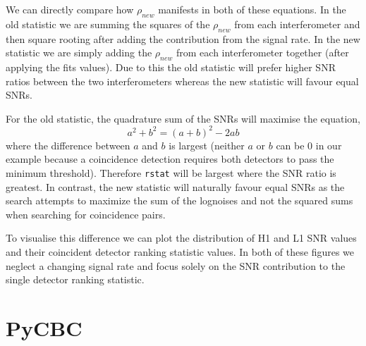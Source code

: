 We can directly compare how $\rho_{new}$ manifests in both of these equations. In the old statistic we are summing the squares of the $\rho_{new}$ from each interferometer and then square rooting after adding the contribution from the signal rate. In the new statistic we are simply adding the $\rho_{new}$ from each interferometer together (after applying the fits values). Due to this the old statistic will prefer higher SNR ratios between the two interferometers whereas the new statistic will favour equal SNRs.

For the old statistic, the quadrature sum of the SNRs will maximise the equation,
%
\begin{equation}
    a^{2} + b^{2} = (a + b)^{2} - 2ab
\end{equation}
%
where the difference between $a$ and $b$ is largest (neither $a$ or $b$ can be $0$ in our example because a coincidence detection requires both detectors to pass the minimum threshold). Therefore \verb|rstat| will be largest where the SNR ratio is greatest. In contrast, the new statistic will naturally favour equal SNRs as the search attempts to maximize the sum of the lognoises and not the squared sums when searching for coincidence pairs.

To visualise this difference we can plot the distribution of H1 and L1 SNR values and their coincident detector ranking statistic values. In both of these figures we neglect a changing signal rate and focus solely on the SNR contribution to the single detector ranking statistic.
%

\section{\label{2:sec:pycbc-live}PyCBC}



